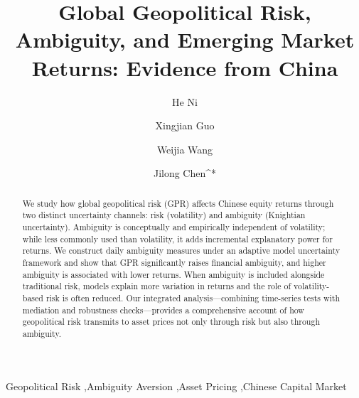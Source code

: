 \documentclass[preprint,12pt,authoryear]{elsarticle}
\begin{document}
\begin{frontmatter}

\title{Global Geopolitical Risk, Ambiguity, and Emerging Market Returns: Evidence from China}

\author[inst1]{He Ni}


\author[inst2]{Xingjian Guo}


\author[inst1]{Weijia Wang}

\author[inst1]{Jilong Chen^*}

\begin{abstract}
We study how global geopolitical risk (GPR) affects Chinese equity returns through two distinct uncertainty channels: risk (volatility) and ambiguity (Knightian uncertainty). Ambiguity is conceptually and empirically independent of volatility; while less commonly used than volatility, it adds incremental explanatory power for returns. We construct daily ambiguity measures under an adaptive model uncertainty framework and show that GPR significantly raises financial ambiguity, and higher ambiguity is associated with lower returns. When ambiguity is included alongside traditional risk, models explain more variation in returns and the role of volatility-based risk is often reduced. Our integrated analysis—combining time-series tests with mediation and robustness checks—provides a comprehensive account of how geopolitical risk transmits to asset prices not only through risk but also through ambiguity.
\end{abstract}

\begin{keyword}
Geopolitical Risk \sep Ambiguity Aversion \sep Asset Pricing \sep Chinese Capital Market 
\end{keyword}

\end{frontmatter}
\end{document}

